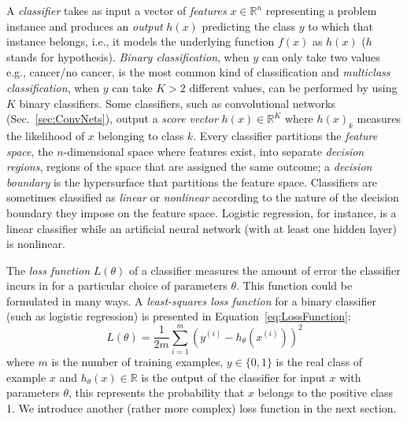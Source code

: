 A \emph{classifier} takes as input a vector of \emph{features} $x \in \mathbb{R}^n$ representing a problem instance and produces an \emph{output} $h(x)$ predicting the class $y$ to which that instance belongs, i.e., it models the underlying function $f(x)$ as $h(x)$ ($h$ stands for hypothesis). \emph{Binary classification}, when $y$ can only take two values e.g., cancer/no cancer, is the most common kind of classification and \emph{multiclass classification}, when $y$ can take $K > 2$ different values, can be performed by using $K$ binary classifiers. Some classifiers, such as convolutional networks (Sec.~\ref{sec:ConvNets}), output a \emph{score vector} $h(x) \in \mathbb{R}^K$ where $h(x)_k$ measures the likelihood of $x$ belonging to class $k$. Every classifier partitions the \emph{feature space}, the $n$-dimensional space where features exist, into separate \emph{decision regions}, regions of the space that are assigned the same outcome; a \emph{decision boundary} is the hypersurface that partitions the feature space. Classifiers are sometimes classified as \emph{linear} or \emph{nonlinear} according to the nature of the decision boundary they impose on the feature space. Logistic regression, for instance, is a linear classifier while an artificial neural network (with at least one hidden layer) is nonlinear.

The \emph{loss function} $L(\theta)$ of a classifier measures the amount of error the classifier incurs in for a particular choice of parameters $\theta$. This function could be formulated in many ways. A \emph{least-squares loss function} for a binary classifier (such as logistic regression) is presented in Equation~\ref{eq:LossFunction}:
\begin{equation}
	L(\theta) = \frac{1}{2m}\sum_{i=1}^m(y^{(i)} - h_\theta(x^{(i)}))^2
	\label{eq:LossFunction}
\end{equation}
where $m$ is the number of training examples, $y \in \{0,1\}$ is the real class of example $x$ and $h_\theta(x) \in \mathbb{R}$ is the output of the classifier for input $x$ with parameters $\theta$, this represents the probability that $x$ belongs to the positive class 1. We introduce another (rather more complex) loss function in the next section.

